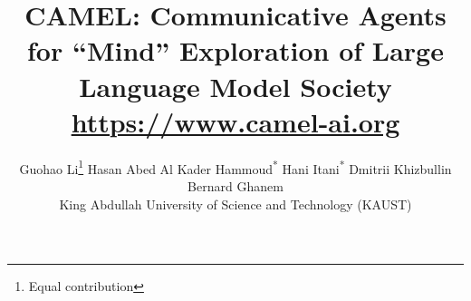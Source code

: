 \documentclass{article}
\begin{document}
    \title{CAMEL: Communicative Agents for ``Mind'' Exploration of Large Language Model Society
    \large{\vspace{3pt} \\\url{https://www.camel-ai.org}}
    \vspace{-10pt} 
    }

\author{%
Guohao Li\thanks{Equal contribution}
\And
Hasan Abed Al Kader Hammoud\textsuperscript{*}
\And Hani Itani\textsuperscript{*}
\And Dmitrii Khizbullin 
\AND Bernard Ghanem \vspace{8pt}\\ 
 King Abdullah University of Science and Technology (KAUST)\\
}


% 

\maketitle








\clearpage




\clearpage
{\small


}
\end{document}
